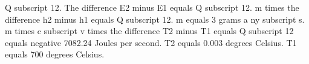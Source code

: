 Q subscript 12.
The difference E2 minus E1 equals Q subscript 12.
m times the difference h2 minus h1 equals Q subscript 12.
m equals 3 grams a ny subscript s.
m times c subscript v times the difference T2 minus T1 equals Q subscript 12 equals negative 7082.24 Joules per second.
T2 equals 0.003 degrees Celsius.
T1 equals 700 degrees Celsius.